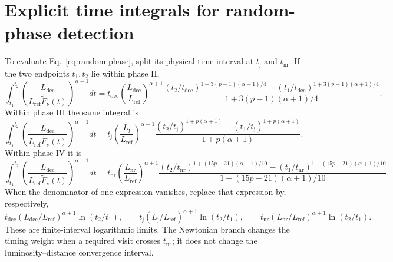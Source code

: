 \documentclass[11pt,a4paper]{article}
\newcommand{\Lref}{L_{\mathrm{ref}}}
\newcommand{\Ldec}{L_{\mathrm{dec}}}
\newcommand{\Lj}{L_{\mathrm j}}
\newcommand{\Lnr}{L_{\mathrm{nr}}}
\newcommand{\tdec}{t_{\mathrm{dec}}}
\newcommand{\tj}{t_{\mathrm j}}
\newcommand{\tnr}{t_{\mathrm{nr}}}
\newcommand{\ft}{\widetilde F_\nu}
\begin{document}
\section{Explicit time integrals for random-phase detection}
\label{app:time}
To evaluate Eq.~\eqref{eq:random-phase}, split its physical time interval
at $\tj$ and $\tnr$. If the two endpoints $t_1,t_2$ lie within phase II,
\begin{equation}
 \int_{t_1}^{t_2}\left(\frac{\Ldec}{\Lref\ft(t)}\right)^{\alpha+1}dt
 =\tdec\left(\frac{\Ldec}{\Lref}\right)^{\alpha+1}
 \frac{(t_2/\tdec)^{1+3(p-1)(\alpha+1)/4}
 -(t_1/\tdec)^{1+3(p-1)(\alpha+1)/4}}
 {1+3(p-1)(\alpha+1)/4}.
 \label{eq:time-II}
\end{equation}
Within phase III the same integral is
\begin{equation}
 \int_{t_1}^{t_2}\left(\frac{\Ldec}{\Lref\ft(t)}\right)^{\alpha+1}dt
 =\tj\left(\frac{\Lj}{\Lref}\right)^{\alpha+1}
 \frac{(t_2/\tj)^{1+p(\alpha+1)}-(t_1/\tj)^{1+p(\alpha+1)}}
 {1+p(\alpha+1)}.
 \label{eq:time-III}
\end{equation}
Within phase IV it is
\begin{equation}
 \int_{t_1}^{t_2}\left(\frac{\Ldec}{\Lref\ft(t)}\right)^{\alpha+1}dt
 =\tnr\left(\frac{\Lnr}{\Lref}\right)^{\alpha+1}
 \frac{(t_2/\tnr)^{1+(15p-21)(\alpha+1)/10}
 -(t_1/\tnr)^{1+(15p-21)(\alpha+1)/10}}
 {1+(15p-21)(\alpha+1)/10}.
 \label{eq:time-IV}
\end{equation}
When the denominator of one expression vanishes, replace that expression
by, respectively,
\begin{equation}
 \tdec(\Ldec/\Lref)^{\alpha+1}\ln(t_2/t_1),\qquad
 \tj(\Lj/\Lref)^{\alpha+1}\ln(t_2/t_1),\qquad
 \tnr(\Lnr/\Lref)^{\alpha+1}\ln(t_2/t_1).
 \label{eq:time-log}
\end{equation}
These are finite-interval logarithmic limits. The Newtonian branch changes
the timing weight when a required visit crosses $\tnr$; it does not change
the luminosity--distance convergence interval.
\end{document}
